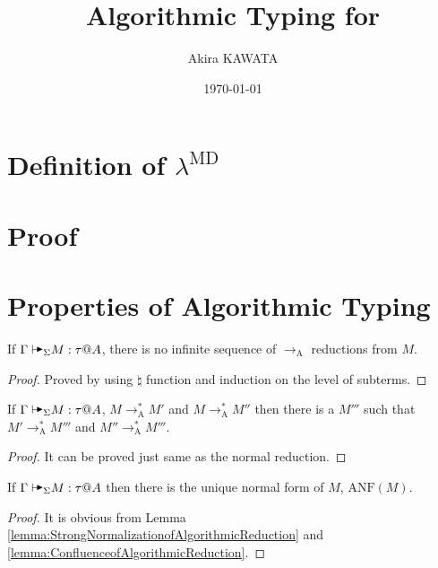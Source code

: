 \documentclass[9pt, a4paper]{extarticle}
\title{Algorithmic Typing for \LMD}
\author{Akira KAWATA}
\date{\today}
\theoremstyle{break}
\newcommand{\G}{\Gamma}
\newcommand{\TB}{{\mathop{\blacktriangleright}}}
\newcommand{\RA}{\longrightarrow_{\text{A}}}
\newcommand{\AV}{\vdash\!\!\!\raisebox{0.4ex}{\scalebox{0.7}{$\TB$}}}
\newcommand{\AVS}{\AV_\Sigma\xspace}
\newcommand{\ANF}{\text{ANF}}
\begin{document}
\maketitle

\section{Definition of \(\lambda^\text{MD}\)}


\section{Proof}


\section{Properties of Algorithmic Typing}

\begin{lemma}
    \label{lemma:StrongNormalizationofAlgorithmicReduction}
    If \( \G \AVS M :\tau @ A\), there is no infinite sequence of \( \RA \) reductions from \( M \).
\end{lemma}

\begin{proof}
    Proved by using \( \natural \) function and induction on the level of subterms.
\end{proof}

\begin{lemma}
    \label{lemma:ConfluenceofAlgorithmicReduction}
    If \( \G \AVS M :\tau @ A\), \( M \RA^* M' \) and \(M \RA^* M''\)
    then there is a \( M''' \) such that \( M' \RA^* M''' \) and \( M'' \RA^* M''' \).
\end{lemma}

\begin{proof}
    It can be proved just same as the normal reduction.
\end{proof}

\begin{lemma}
    \label{lemma:UniquenessofAlgorithmicReduction}
    If \( \G \AVS M : \tau @ A \) then there is the unique normal form of \( M \), \( \ANF(M) \).
\end{lemma}

\begin{proof}
    It is obvious from Lemma \ref{lemma:StrongNormalizationofAlgorithmicReduction} and \ref{lemma:ConfluenceofAlgorithmicReduction}.
\end{proof}
\end{document}
